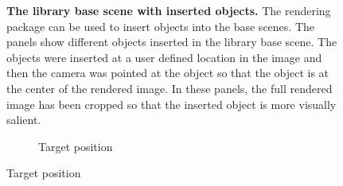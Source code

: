 \documentclass{jov}
\begin{document}
\begin{figure}
\begin{subfigure}[b]{0.14 \textwidth}
        \label{fig:libraryWithChampagneBottle}
    \end{subfigure}
\caption{{\bf The library base scene with inserted objects.} The rendering package can be used to insert objects into the base scenes. The panels show different objects inserted in the library base scene. The objects were inserted at a user defined location in the image and then the camera was pointed at the object so that the object is at the center of the rendered image. In these panels, the full rendered image has been cropped so that the inserted object is more visually salient.}\label{fig:libraryWithTarget}
\end{figure}

\begin{figure}
	\begin{subfigure}[b]{0.18 \textwidth}
    \centering
        \caption{Target position}

\end{subfigure}
\end{figure}
\end{document}
